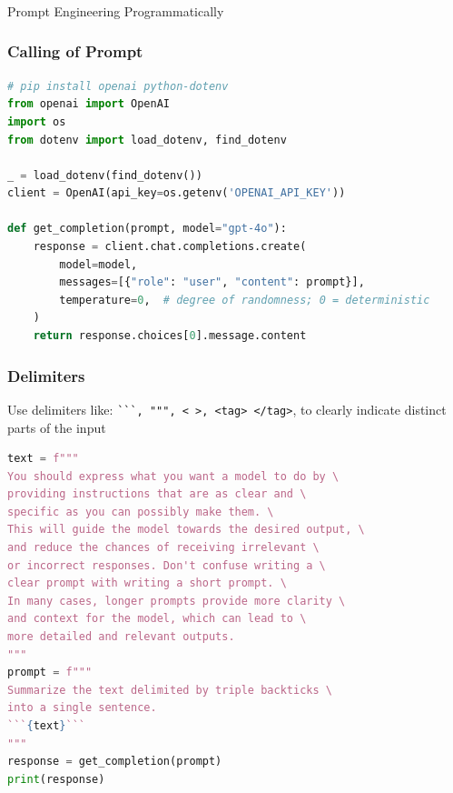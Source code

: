 \begin{frame}[fragile]\frametitle{}
\begin{center}
{\Large Prompt Engineering Programmatically}
\end{center}
\end{frame}


\begin{frame}[fragile]\frametitle{Calling of Prompt}

\begin{lstlisting}[language=Python]
# pip install openai python-dotenv
from openai import OpenAI
import os
from dotenv import load_dotenv, find_dotenv

_ = load_dotenv(find_dotenv())
client = OpenAI(api_key=os.getenv('OPENAI_API_KEY'))

def get_completion(prompt, model="gpt-4o"):
    response = client.chat.completions.create(
        model=model,
        messages=[{"role": "user", "content": prompt}],
        temperature=0,  # degree of randomness; 0 = deterministic
    )
    return response.choices[0].message.content
\end{lstlisting}
		
\end{frame}


\begin{frame}[fragile]\frametitle{Delimiters}

Use delimiters like: \lstinline|```, """, < >, <tag> </tag>|,  to clearly indicate distinct parts of the input

\begin{lstlisting}[language=Python]
text = f"""
You should express what you want a model to do by \ 
providing instructions that are as clear and \ 
specific as you can possibly make them. \ 
This will guide the model towards the desired output, \ 
and reduce the chances of receiving irrelevant \ 
or incorrect responses. Don't confuse writing a \ 
clear prompt with writing a short prompt. \ 
In many cases, longer prompts provide more clarity \ 
and context for the model, which can lead to \ 
more detailed and relevant outputs.
"""
prompt = f"""
Summarize the text delimited by triple backticks \ 
into a single sentence.
```{text}```
"""
response = get_completion(prompt)
print(response)
\end{lstlisting}
		
		
\end{frame}

